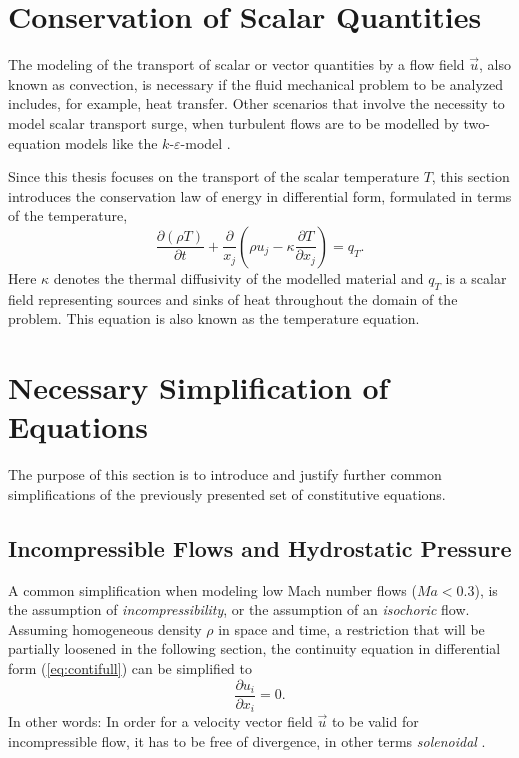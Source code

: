\section{Conservation of Scalar Quantities}

The modeling of the transport of scalar or vector quantities by a flow field \(\vec{u}\), also known as convection, is necessary if the fluid mechanical problem to be analyzed includes, for example, heat transfer. Other scenarios that involve the necessity to model scalar transport surge, when turbulent flows are to be modelled by two-equation models like the \(k\)-\(\varepsilon\)-model \cite{pope00}. 
    
Since this thesis focuses on the transport of the scalar temperature \(T\), this section introduces the conservation law of energy in differential form, formulated in terms of the temperature,
\begin{displaymath}
  \frac{\partial \left(\rho T \right)}{\partial t} + \frac{\partial}{x_j} \left( \rho u_j - \kappa \frac{\partial T}{\partial x_j} \right) = q_T.
\end{displaymath}
Here \(\kappa\) denotes the thermal diffusivity of the modelled material and \(q_T\) is a scalar field representing sources and sinks of heat throughout the domain of the problem. This equation is also known as the temperature equation.


\section{Necessary Simplification of Equations}

The purpose of this section is to introduce and justify further common simplifications of the previously presented set of constitutive equations. 

\subsection{Incompressible Flows and Hydrostatic Pressure}

A common simplification when modeling low Mach number flows (\(Ma < 0.3\)), is the assumption of \emph{incompressibility}, or the assumption of an \emph{isochoric} flow. Assuming homogeneous density \(\rho\) in space and time, a restriction that will be partially loosened in the following section, the continuity equation in differential form (\ref{eq:contifull}) can be simplified to
\begin{displaymath}
  \frac{\partial u_i}{\partial x_i} = 0.
\end{displaymath}
In other words: In order for a velocity vector field \(\vec{u}\) to be valid for incompressible flow, it has to be free of divergence, in other terms \emph{solenoidal} \cite{spurk10,aris62}.

